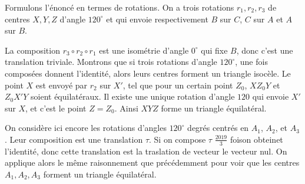\begin{sol}
\begin{center}
\end{center}
Formulons l'énoncé en termes de rotations. On a trois rotations $r_1,r_2,r_3$ de centres $X,Y,Z$ d'angle $120^\circ$ et qui envoie respectivement $B$ sur $C$, $C$ sur $A$ et $A$ sur $B$.

\medskip

La composition $r_3\circ r_2\circ r_1$ est une isométrie d'angle $0^\circ$ qui fixe $B$, donc c'est une translation triviale. Montrons que si trois rotations d'angle $120^\circ$, une fois composées donnent l'identité, alors leurs centres forment un triangle isocèle. Le point $X$ est envoyé par $r_2$ sur $X'$, tel que pour un certain point $Z_0$, $XZ_0Y$ et $Z_0X'Y$ soient équilatéraux. Il existe une unique rotation d'angle $120$ qui envoie $X'$ sur $X$, et c'est le point $Z=Z_0$. Ainsi $XYZ$ forme un triangle équilatéral.
\end{sol}

\begin{sol}
On considère ici encore les rotations d'angles $120^\circ$ degrés centrés en $A_1$, $A_2$, et $A_3$. Leur composition est une translation $\tau$. Si on compose $\tau$ $\frac{2019}{3}$ foison obteinet l'identité, donc cette translation est la traslation de vecteur le vecteur nul. On applique alors le même raisonnement que précédemment pour voir que les centres $A_1,A_2,A_3$ forment un triangle équilatéral.
\end{sol}


